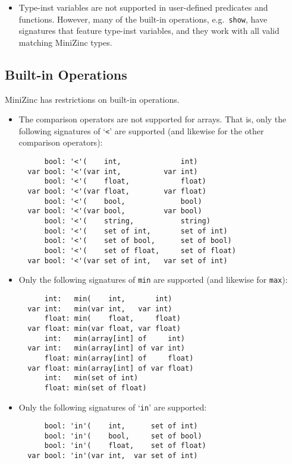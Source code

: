 \documentclass[10pt]{scrartcl}
\begin{document}
{\begin{itemize}
    However, explicit type coercions are supported
    (e.g.~\texttt{int2float}), as are implicit inst coercions
    (e.g.~par-int-to-var-int).
\item
    Type-inst variables are not supported in user-defined predicates and
    functions.  However, many of the built-in operations,
    e.g.~\texttt{show}, have signatures that feature type-inst variables,
    and they work with all valid matching MiniZinc types.
\end{itemize}

\subsection{Built-in Operations}
MiniZinc has restrictions on built-in operations.
\begin{itemize}
\item
    The comparison operators are not supported for arrays. That is,
    only the following signatures of `\texttt{<}' are supported
    (and likewise for the other comparison operators):
\begin{verbatim}
      bool: '<'(    int,              int)
  var bool: '<'(var int,          var int)
      bool: '<'(    float,            float)
  var bool: '<'(var float,        var float)
      bool: '<'(    bool,             bool)
  var bool: '<'(var bool,         var bool)
      bool: '<'(    string,           string)
      bool: '<'(    set of int,       set of int)
      bool: '<'(    set of bool,      set of bool)
      bool: '<'(    set of float,     set of float)
  var bool: '<'(var set of int,   var set of int)
\end{verbatim}

\item
    Only the following signatures of \texttt{min} are supported (and
    likewise for \texttt{max}):
\begin{verbatim}
      int:   min(    int,       int)
  var int:   min(var int,   var int)
      float: min(    float,     float)
  var float: min(var float, var float)
      int:   min(array[int] of     int)
  var int:   min(array[int] of var int)
      float: min(array[int] of     float)
  var float: min(array[int] of var float)
      int:   min(set of int)
      float: min(set of float)
\end{verbatim}
\item
    Only the following signatures of `\texttt{in}' are supported:
\begin{verbatim}
      bool: 'in'(    int,      set of int)
      bool: 'in'(    bool,     set of bool)
      bool: 'in'(    float,    set of float)
  var bool: 'in'(var int,  var set of int)
\end{verbatim}


\end{itemize}}
\end{document}

